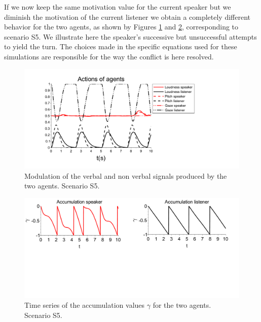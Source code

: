 If we now keep the same motivation value for the current speaker but we diminish the motivation of the current listener we obtain a completely different behavior for the two agents, as shown by Figures \ref{simu_buttin} and \ref{acc_buttin}, corresponding to scenario S5. We illustrate here the speaker's successive but unsuccessful attempts to yield the turn. The choices made in the specific equations used for these simulations are responsible for the way the conflict is here resolved.  

\begin{figure}
  \centering
  \includegraphics[width=\linewidth]{figure/emerg_sc2.pdf}
  \caption{Modulation of the verbal and non verbal signals produced by the two agents. Scenario S5.}
  \label{simu_buttin}
\end{figure}

\begin{figure}
  \centering
  \includegraphics[width=\linewidth]{figure/acc_sc2.pdf}
  \caption{Time series of the accumulation values $\gamma$ for the two agents. Scenario S5.}
  \label{acc_buttin}
\end{figure}

